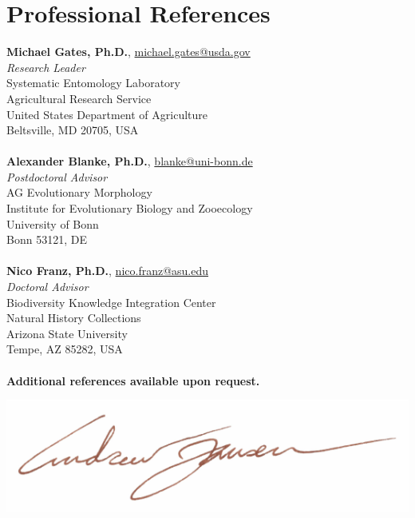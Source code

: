 \documentclass[12pt,a4paper]{article}
\begin{document}
\section*{Professional References}
	\textbf{Michael Gates, Ph.D.}, \href{mailto:michael.gates@usda.gov}{michael.gates@usda.gov}\\
	\textit{Research Leader}\\
	Systematic Entomology Laboratory\\
	Agricultural Research Service\\
	United States Department of Agriculture\\
	Beltsville, MD 20705, USA\\
	\\
	\textbf{Alexander Blanke, Ph.D.}, \href{mailto:blanke@uni-bonn.de}{blanke@uni-bonn.de}\\
	\textit{Postdoctoral Advisor}\\
	AG Evolutionary Morphology\\
	Institute for Evolutionary Biology and Zooecology\\
	University of Bonn\\
	Bonn 53121, DE\\
	\\
	\textbf{Nico Franz, Ph.D.}, \href{mailto:nico.franz@asu.edu}{nico.franz@asu.edu}\\
	\textit{Doctoral Advisor}\\
	Biodiversity Knowledge Integration Center\\
	Natural History Collections\\
	Arizona State University\\
	Tempe, AZ 85282, USA\\
	\\
	\textbf{Additional references available upon request.}

\vspace*{0.2cm}
\includegraphics[scale=1]{signature.pdf}
\end{document}
